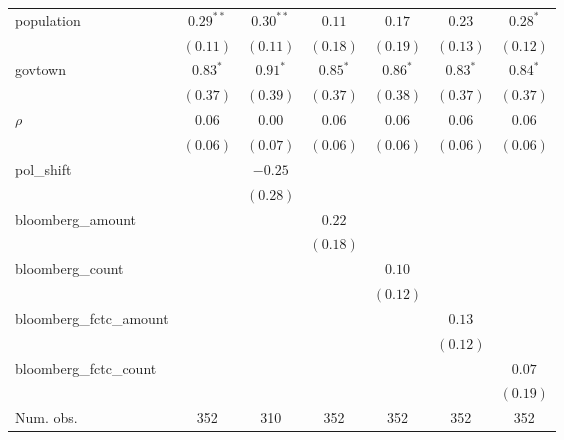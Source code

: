 \begin{table}[!h]
\begin{center}
\begin{tabular}{l c c c c c c }
population              & $0.29^{**}$  & $0.30^{**}$  & $0.11$       & $0.17$       & $0.23$       & $0.28^{*}$   \\
                        & $(0.11)$     & $(0.11)$     & $(0.18)$     & $(0.19)$     & $(0.13)$     & $(0.12)$     \\
govtown                 & $0.83^{*}$   & $0.91^{*}$   & $0.85^{*}$   & $0.86^{*}$   & $0.83^{*}$   & $0.84^{*}$   \\
                        & $(0.37)$     & $(0.39)$     & $(0.37)$     & $(0.38)$     & $(0.37)$     & $(0.37)$     \\
$\rho$                  & $0.06$       & $0.00$       & $0.06$       & $0.06$       & $0.06$       & $0.06$       \\
                        & $(0.06)$     & $(0.07)$     & $(0.06)$     & $(0.06)$     & $(0.06)$     & $(0.06)$     \\
pol\_shift              &              & $-0.25$      &              &              &              &              \\
                        &              & $(0.28)$     &              &              &              &              \\
bloomberg\_amount       &              &              & $0.22$       &              &              &              \\
                        &              &              & $(0.18)$     &              &              &              \\
bloomberg\_count        &              &              &              & $0.10$       &              &              \\
                        &              &              &              & $(0.12)$     &              &              \\
bloomberg\_fctc\_amount &              &              &              &              & $0.13$       &              \\
                        &              &              &              &              & $(0.12)$     &              \\
bloomberg\_fctc\_count  &              &              &              &              &              & $0.07$       \\
                        &              &              &              &              &              & $(0.19)$     \\
\midrule
Num. obs.               & 352          & 310          & 352          & 352          & 352          & 352          \\

\end{tabular}
\end{center}
\end{table}
